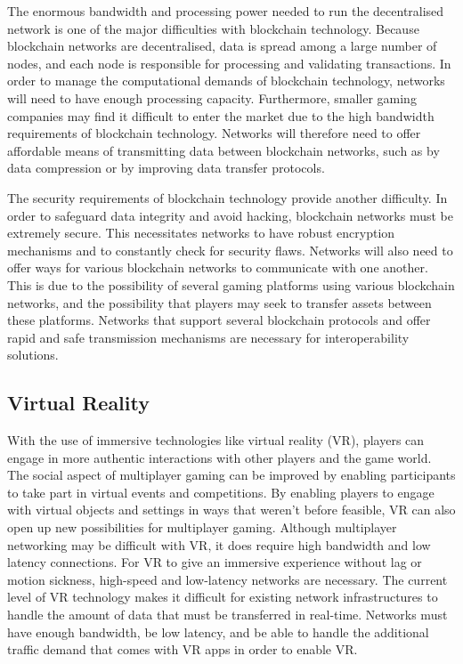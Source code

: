 The enormous bandwidth and processing power needed to run the decentralised network is one of the major difficulties with blockchain technology. Because blockchain networks are decentralised, data is spread among a large number of nodes, and each node is responsible for processing and validating transactions.\cite{blockchainNFT} In order to manage the computational demands of blockchain technology, networks will need to have enough processing capacity.
Furthermore, smaller gaming companies may find it difficult to enter the market due to the high bandwidth requirements of blockchain technology. Networks will therefore need to offer affordable means of transmitting data between blockchain networks, such as by data compression or by improving data transfer protocols.\cite{blockchaingaming}

The security requirements of blockchain technology provide another difficulty. In order to safeguard data integrity and avoid hacking, blockchain networks must be extremely secure. This necessitates networks to have robust encryption mechanisms and to constantly check for security flaws.\cite{blockchainNFT}
Networks will also need to offer ways for various blockchain networks to communicate with one another. This is due to the possibility of several gaming platforms using various blockchain networks, and the possibility that players may seek to transfer assets between these platforms. Networks that support several blockchain protocols and offer rapid and safe transmission mechanisms are necessary for interoperability solutions.\cite{blockchaingaming}

\subsection{Virtual Reality}
With the use of immersive technologies like virtual reality (VR), players can engage in more authentic interactions with other players and the game world. The social aspect of multiplayer gaming can be improved by enabling participants to take part in virtual events and competitions. By enabling players to engage with virtual objects and settings in ways that weren't before feasible, VR can also open up new possibilities for multiplayer gaming. Although multiplayer networking may be difficult with VR, it does require high bandwidth and low latency connections.\cite{WEF2021}
For VR to give an immersive experience without lag or motion sickness, high-speed and low-latency networks are necessary. The current level of VR technology makes it difficult for existing network infrastructures to handle the amount of data that must be transferred in real-time. Networks must have enough bandwidth, be low latency, and be able to handle the additional traffic demand that comes with VR apps in order to enable VR.\cite{WEF2021}

